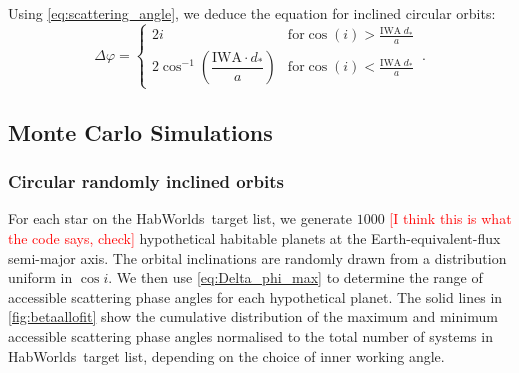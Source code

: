 \documentclass[
    usenatbib,
]{mnras}
\newcommand{\todo}[1]{\textcolor{red}{[#1]}}
\newcommand{\hwo}{HabWorlds}
\begin{document}
Using \cref{eq:scattering_angle}, we deduce the equation for inclined circular orbits: 
\begin{equation}
\label{eq:Delta_phi_max}
    \Delta \varphi = 
    \begin{cases}
        2 i & \textrm{for} \cos(i) > \frac{\mathrm{IWA}\; d_* }{a}
  \\ 
        2  \cos^{-1}\left(\dfrac{\mathrm{IWA}\cdot d_* }{a}\right)  & \textrm{for} \cos(i) < \frac{\mathrm{IWA}\; d_* }{a}
    \end{cases}\,.
\end{equation}





\subsection{Monte Carlo Simulations}

\subsubsection{Circular randomly inclined orbits}
\label{sec:circular}

For each star on the \hwo\ target list, we generate $1000$ \todo{I think this is what the code says, check} hypothetical habitable planets at the Earth-equivalent-flux semi-major axis. 
%
The orbital inclinations are randomly drawn from a distribution uniform in $\cos i$. 
%
We then use \cref{eq:Delta_phi_max} to determine the range of accessible scattering phase angles for each hypothetical planet.
%
The solid lines in \cref{fig:betaallofit} show the cumulative distribution of the maximum and minimum accessible scattering phase angles normalised to the total number of systems in \hwo\ target list, depending on the choice of inner working angle.  

\end{document}
